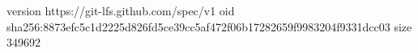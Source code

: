 version https://git-lfs.github.com/spec/v1
oid sha256:8873efc5c1d2225d826fd5ce39cc5af472f06b17282659f9983204f9331dcc03
size 349692
